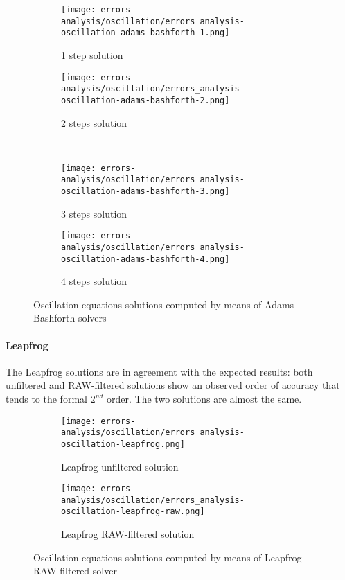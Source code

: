 \documentclass[pdftex,preprint,3p,times,numbers]{elsarticle}
\begin{document}
\begin{figure}[!ht]
  \centering
  \begin{subfigure}[b]{0.45\textwidth}
    \centering
    \texttt{[image: errors-analysis/oscillation/errors\_analysis-oscillation-adams-bashforth-1.png]}
    \caption{1 step solution}\label{fig:results-oscillation-adams-bashforth-1}
  \end{subfigure}\quad%
  \begin{subfigure}[b]{0.45\textwidth}
    \centering
    \texttt{[image: errors-analysis/oscillation/errors\_analysis-oscillation-adams-bashforth-2.png]}
    \caption{2 steps solution}\label{fig:results-oscillation-adams-bashforth-2}
  \end{subfigure}\\
  \begin{subfigure}[b]{0.45\textwidth}
    \centering
    \texttt{[image: errors-analysis/oscillation/errors\_analysis-oscillation-adams-bashforth-3.png]}
    \caption{3 steps solution}\label{fig:results-oscillation-adams-bashforth-3}
  \end{subfigure}\quad%
  \begin{subfigure}[b]{0.45\textwidth}
    \centering
    \texttt{[image: errors-analysis/oscillation/errors\_analysis-oscillation-adams-bashforth-4.png]}
    \caption{4 steps solution}\label{fig:results-oscillation-adams-bashforth-4}
  \end{subfigure}
  \caption{Oscillation equations solutions computed by means of Adams-Bashforth solvers}\label{fig:results-oscillation-adams-bashforth}
\end{figure}

\paragraph{Leapfrog}

The Leapfrog solutions are in agreement with the expected results: both unfiltered and RAW-filtered solutions show an observed order of accuracy that tends to the formal $2^{nd}$ order. The two solutions are almost the same.

\begin{figure}[!ht]
  \centering
  \begin{subfigure}[b]{0.45\textwidth}
    \centering
    \texttt{[image: errors-analysis/oscillation/errors\_analysis-oscillation-leapfrog.png]}
    \caption{Leapfrog unfiltered solution}\label{fig:results-oscillation-leapfrog-unfiltered}
  \end{subfigure}\quad%
  \begin{subfigure}[b]{0.45\textwidth}
    \centering
    \texttt{[image: errors-analysis/oscillation/errors\_analysis-oscillation-leapfrog-raw.png]}
    \caption{Leapfrog RAW-filtered solution}\label{fig:results-oscillation-leapfrog-raw}
  \end{subfigure}
  \caption{Oscillation equations solutions computed by means of Leapfrog RAW-filtered solver}\label{fig:results-oscillation-leapfrog}
\end{figure}
\end{document}
